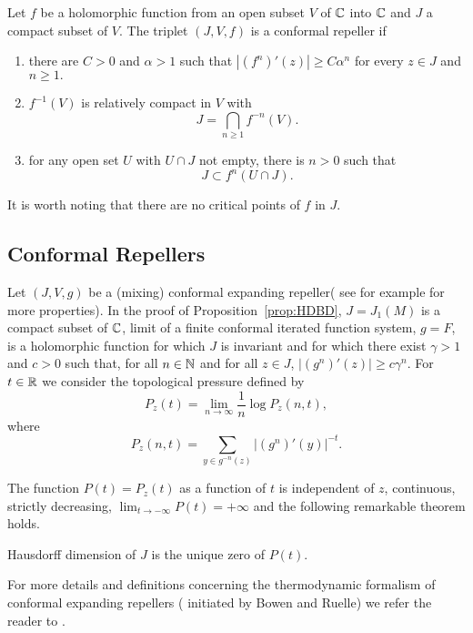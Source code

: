 \begin{definition}
  Let $f$ be a holomorphic function from an open subset $V$ of ${\mathbb C}$ into
  ${\mathbb C}$ and $J$ a compact subset of $V.$ The triplet $(J, V, f)$ is a
  conformal repeller if
  \begin{enumerate}
  \item there are $C>0$ and $\alpha >1$ such that $|(f^n)'(z)|\geq
    C\alpha^n$ for every $z\in J$ and $n\geq 1.$
  \item $f^{-1}(V)$ is relatively compact in $V$ with
      \[J=\bigcap_{n\geq 1}f^{-n}(V).\]
    \item for any open set $U$ with $U\cap J$ not empty, there is $n>0$ such
      that \[J\subset f^n(U\cap J).\]
  \end{enumerate}
\end{definition}

It is worth noting that there are no critical points of $f$ in $J.$ 

\subsection{Conformal Repellers}

Let $(J,V,g)$ be a (mixing) conformal expanding repeller( see for example
\cite{zinnmeister:thermodynamic} for more properties). In the proof of
Proposition~\ref{prop:HDBD}, $J=J_1(M)$ is a compact subset of ${\mathbb C}$, limit
of a finite conformal iterated function system, $g=F$, is a holomorphic
function for which $J$ is invariant and for which there exist $\gamma >1$
and $c>0 $ such that, for all $n\in{\mathbb N}$ and for all $z\in J$,
$|(g^n)'(z)|\geq c \gamma^n$.  For $t\in{\mathbb R}$ we consider the topological
pressure defined by
\[
P_z(t)=\lim_{n\rightarrow\infty}\frac{1}{n}\log P_z(n,t),
\]
where
\[
P_z(n,t)=\sum_{y\in g^{-n}(z)} |(g^n)'(y)|^{-t}.
\]

The function $P(t)=P_z(t)$ as a function of $t$ is independent of $z$,
continuous, strictly decreasing, $\lim_{t\to -\infty} P(t)=+\infty$ and the
following remarkable theorem holds.

\begin{theorem}
  Hausdorff dimension of $J$ is the unique zero of $P(t)$.
\end{theorem}

For more details and definitions concerning the thermodynamic formalism of
conformal expanding repellers ( initiated by Bowen and Ruelle) we refer the
reader to \cite{zinnmeister:thermodynamic}.

